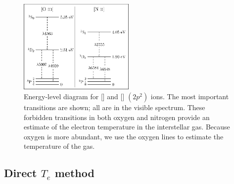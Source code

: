 \begin{figure}
    \centering
    \includegraphics[width=0.5\textwidth]{Images/Paper2/NIIOIII_energy_level_diagram-figure0}
    \caption[{[] and [] energy-level diagram}]{Energy-level 
    diagram for [] and [] $(2p^2)$ ions.  The most important 
    transitions are shown; all are in the visible spectrum.  These forbidden 
    transitions in both oxygen and nitrogen provide an estimate of the electron 
    temperature in the interstellar gas.  Because oxygen is more abundant, we 
    use the oxygen lines to estimate the temperature of the gas.}
    \label{fig:transitions_P2}
\end{figure}


\subsection{Direct $T_e$ method}

